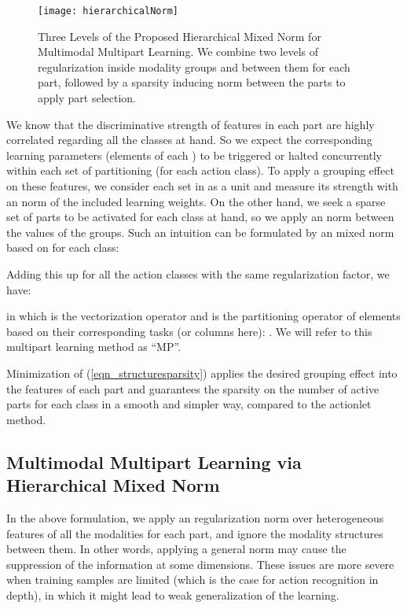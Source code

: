 \documentclass[9pt,technote,compsoc]{IEEEtran}
\begin{document}
\begin{figure}
\centering
\texttt{[image: hierarchicalNorm]}
\caption{Three Levels of the Proposed Hierarchical Mixed Norm for Multimodal Multipart Learning. We combine two levels of regularization inside modality groups and between them for each part, followed by a sparsity inducing norm between the parts to apply part selection.}
\label{fig:FrameworkHieararchical}
\end{figure}

We know that the discriminative strength of features in each part are highly correlated regarding all the classes at hand. So we expect the corresponding learning parameters (elements of each ) to be triggered or halted concurrently within each set of  partitioning (for each action class). To apply a grouping effect on these features, we consider each set in  as a unit and measure its strength with an  norm of the included learning weights. On the other hand, we seek a sparse set of parts to be activated for each class at hand, so we apply an  norm between the  values of the groups. Such an intuition can be formulated by an  mixed norm based on  for each class:

Adding this up for all the action classes with the same regularization factor, we have:

in which  is the vectorization operator and  is the partitioning operator of  elements based on their corresponding tasks (or columns here): . We will refer to this multipart learning method as ``MP''.

Minimization of (\ref{eqn_structuresparsity}) applies the desired grouping effect into the features of each part and guarantees the sparsity on the number of active parts for each class in a smooth and simpler way, compared to the actionlet method.

\subsection{Multimodal Multipart Learning via Hierarchical Mixed Norm}


In the above formulation, we apply an  regularization norm over heterogeneous features of all the modalities for each part, and ignore the modality structures between them. In other words, applying a general  norm may cause the suppression of the information at some dimensions. These issues are more severe when training samples are limited (which is the case for action recognition in depth), in which it might lead to weak generalization of the learning. 
\end{document}
